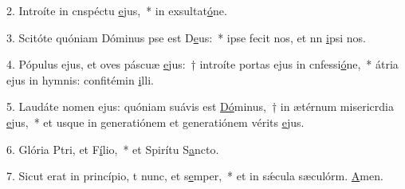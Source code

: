 2. Introíte in cnspéctu \uline{e}jus,~* in exsultat\uline{ó}ne.\par 
3. Scitóte quóniam Dóminus pse est D\uline{e}us:~* ipse fecit nos, et nn \uline{i}psi nos.\par 
4. Pópulus ejus, et oves páscuæ \uline{e}jus:~† introíte portas ejus in cnfessi\uline{ó}ne,~* átria ejus in hymnis: confitémin \uline{i}lli.\par 
5. Laudáte nomen ejus: quóniam suávis est \uline{Dó}minus,~† in ætérnum misericrdia \uline{e}jus,~* et usque in generatiónem et generatiónem vérits \uline{e}jus.\par 
6. Glória Ptri, et F\uline{í}lio,~* et Spirítu S\uline{a}ncto.\par 
7. Sicut erat in princípio, t nunc, et s\uline{e}mper,~* et in sǽcula sæculórm. \uline{A}men.\par 

